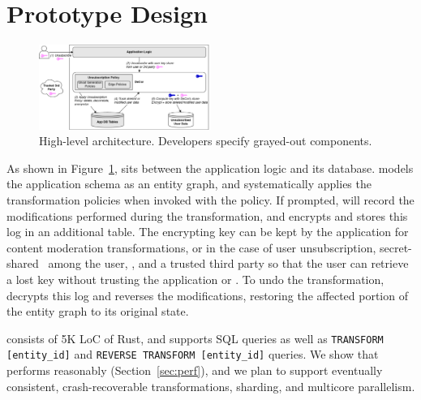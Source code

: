 \section{Prototype Design}
\label{sec:proto}

\begin{figure}[t!]
    \centering
    \includegraphics[width=0.5\textwidth]{img/releaser_arch}

    \caption{High-level \sys architecture. Developers specify grayed-out components.}
    \label{fig:arch}
\end{figure}

As shown in Figure~\ref{fig:arch}, \sys sits between the application logic and its database. \sys
models the application schema as an entity graph, and systematically applies the transformation
policies when invoked with the policy. 
If prompted, \sys will record the modifications performed during the transformation, and encrypts and
stores this log in an additional table. The encrypting key can be kept by the application for \eg content
moderation transformations, or in the case of user unsubscription, secret-shared~\cite{secretsharing}
among the user, \sys, and a trusted third party so that the user can retrieve a lost key without
trusting the application or \sys. To undo the transformation, \sys decrypts this log and reverses the
modifications, restoring the affected portion of the entity graph to its original state.

\sys consists of 5K LoC of Rust, and supports SQL queries as well as \texttt{TRANSFORM
[entity\_id]} and \texttt{REVERSE TRANSFORM [entity\_id]} queries.
We show that \sys performs reasonably (Section~\ref{sec:perf}), and we plan to support eventually
consistent, crash-recoverable transformations, sharding, and multicore parallelism.




